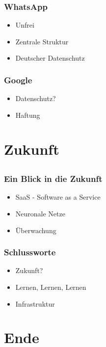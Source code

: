 \documentclass[12pt, table]{beamer}
\begin{document}
  \begin{frame}
    \frametitle{WhatsApp}
    \begin{itemize}
      \item Unfrei
      \item Zentrale Struktur
      \item Deutscher Datenschutz
    \end{itemize}
  \end{frame}

  \begin{frame}
    \frametitle{Google}
    \begin{itemize}
      \item Datenschutz?
      \item Haftung
    \end{itemize}
  \end{frame}

\section{Zukunft}
  \subsection{}
  
  \begin{frame}
    \frametitle{Ein Blick in die Zukunft}
    \begin{itemize}
      \item SaaS - Software as a Service
      \item Neuronale Netze
      \item Überwachung
    \end{itemize}
  \end{frame}
  
  \begin{frame}
    \frametitle{Schlussworte}
    \begin{itemize}
      \item Zukunft?
      \item Lernen, Lernen, Lernen
      \item Infrastruktur
    \end{itemize}
  \end{frame}
  
\section{Ende}
  \subsection{}
  
\end{document}
